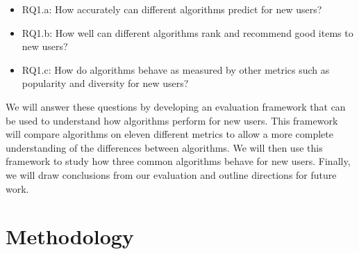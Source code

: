 \documentclass[letterpaper]{sig-alternate}
\begin{document}
      
  \begin{itemize}
  \item RQ1.a: How accurately can different algorithms predict for new users?
  \item RQ1.b: How well can different algorithms rank and recommend good items to new users?
  \item RQ1.c: How do algorithms behave as measured by other metrics such as popularity and diversity for new users?
  \end{itemize}

  We will answer these questions by developing an evaluation framework that can be used to understand how algorithms perform for new users.
  This framework will compare algorithms on eleven different metrics to allow a more complete understanding of the differences between algorithms.
  We will then use this framework to study how three common algorithms behave for new users.
  Finally, we will draw conclusions from our evaluation and outline directions for future work.

\section{Methodology}
\label{sec:methodology}
\end{document}
